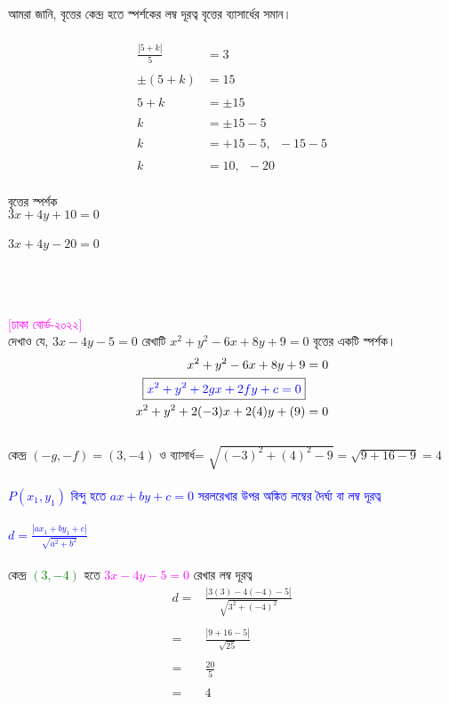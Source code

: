 \documentclass{article}
\begin{document}
আমরা জানি, বৃত্তের কেন্দ্র হতে স্পর্শকের লম্ব দূরত্ব বৃত্তের ব্যাসার্ধের সমান। \\
\\ 
	\begin{align*}
		\frac{|5+k|}{5}&=3\\
		\\
		\pm (5+k)&=15\\
		\\
		5+k&=\pm 15\\
		\\
		k&=\pm 15-5\\
		\\
		k&=+15-5,\,\,\,-15-5\\
		\\
		k&=10,\,\,\,-20
\end{align*}
\\
বৃত্তের স্পর্শক \\ 
$3x+4y+10=0$\\
\\
$3x+4y-20=0$\\
\\
\\
\\ 
\textcolor{magenta}{[ঢাকা বোর্ড-২০২২]}\\
দেখাও যে, $3x-4y-5=0$ রেখাটি  $x^2+y^2-6x+8y+9=0$ বৃত্তের একটি স্পর্শক। 
\\
	\begin{align*}
x^2+y^2-6x+8y+9&=0\\
	\boxed{\textcolor{blue}{x^2+y^2+2gx+2fy+c=0}}&\\
	x^2+y^2+2(-3)x+2(4)y+(9)&=0
\end{align*}
	\\
কেন্দ্র 	$(-g,-f)=(3,-4)$ ও ব্যাসার্ধ= $\sqrt{(-3)^2+(4)^2-9}=\sqrt{9+16-9}=4$\\
\\ 
\textcolor{blue}{$P(x_1,y_1)$ বিন্দু হতে  $ax+by+c=0$ সরলরেখার উপর অঙ্কিত লম্বের দৈর্ঘ্য বা লম্ব দূরত্ব \\
	\\
	$d=\frac{|ax_1+by_1+c|}{\sqrt{a^2+b^2}}$}\\
\\
কেন্দ্র \textcolor{green}{$(3,-4)$} হতে \textcolor{magenta}{$3x-4y-5=0$}  রেখার লম্ব দূরত্ব \\
\begin{align*}
	d=	&\frac{|3(3)-4(-4)-5|}{\sqrt{3^2+(-4)^2}}\\
	\\
	=	&	\frac{|9+16-5|}{\sqrt{25}}\\
		\\
			=	&	\frac{20}{5}\\
			\\
			=&4
\end{align*}
\end{document}
